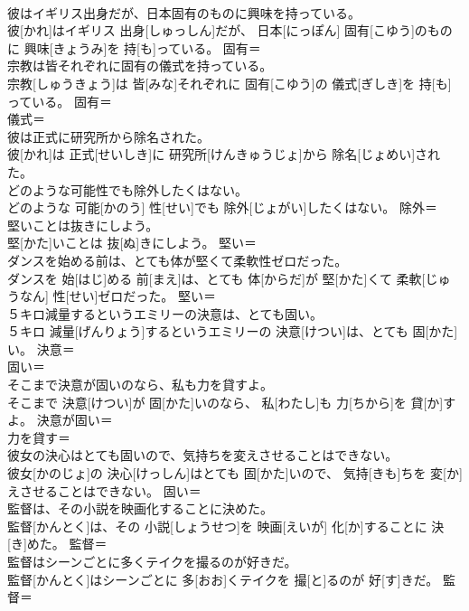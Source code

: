 \documentclass[8pt]{extreport}
\begin{document}
\begin{CJK}{UTF8}{min}
\\	彼はイギリス出身だが、日本固有のものに興味を持っている。	
\\	彼[かれ]はイギリス 出身[しゅっしん]だが、 日本[にっぽん] 固有[こゆう]のものに 興味[きょうみ]を 持[も]っている。	固有＝ 
\\	宗教は皆それぞれに固有の儀式を持っている。	
\\	宗教[しゅうきょう]は 皆[みな]それぞれに 固有[こゆう]の 儀式[ぎしき]を 持[も]っている。	固有＝ 
\\	儀式＝ 
\\	彼は正式に研究所から除名された。	
\\	彼[かれ]は 正式[せいしき]に 研究所[けんきゅうじょ]から 除名[じょめい]された。	
\\	どのような可能性でも除外したくはない。	
\\	どのような 可能[かのう] 性[せい]でも 除外[じょがい]したくはない。	除外＝ 
\\	堅いことは抜きにしよう。	
\\	堅[かた]いことは 抜[ぬ]きにしよう。	堅い＝ 
\\	ダンスを始める前は、とても体が堅くて柔軟性ゼロだった。	
\\	ダンスを 始[はじ]める 前[まえ]は、とても 体[からだ]が 堅[かた]くて 柔軟[じゅうなん] 性[せい]ゼロだった。	堅い＝ 
\\	５キロ減量するというエミリーの決意は、とても固い。	
\\	５キロ 減量[げんりょう]するというエミリーの 決意[けつい]は、とても 固[かた]い。	決意＝ 
\\	固い＝ 
\\	そこまで決意が固いのなら、私も力を貸すよ。	
\\	そこまで 決意[けつい]が 固[かた]いのなら、 私[わたし]も 力[ちから]を 貸[か]すよ。	決意が固い＝ 
\\	力を貸す＝ 
\\	彼女の決心はとても固いので、気持ちを変えさせることはできない。	
\\	彼女[かのじょ]の 決心[けっしん]はとても 固[かた]いので、 気持[きも]ちを 変[か]えさせることはできない。	固い＝ 
\\	監督は、その小説を映画化することに決めた。	
\\	監督[かんとく]は、その 小説[しょうせつ]を 映画[えいが] 化[か]することに 決[き]めた。	監督＝ 
\\	監督はシーンごとに多くテイクを撮るのが好きだ。	
\\	監督[かんとく]はシーンごとに 多[おお]くテイクを 撮[と]るのが 好[す]きだ。	監督＝ 

\end{CJK}
\end{document}
